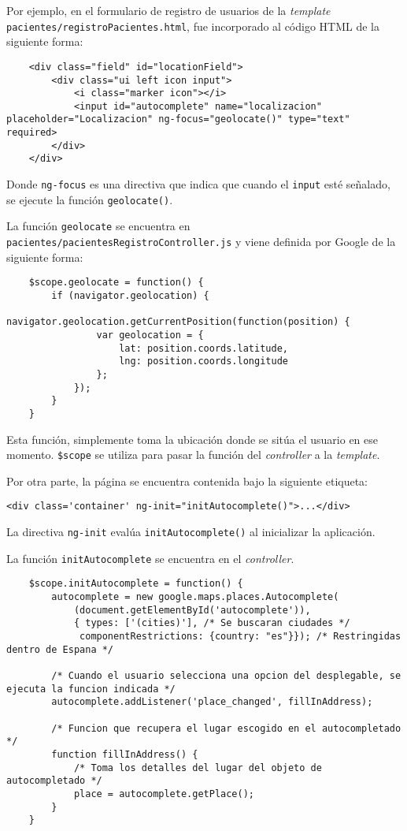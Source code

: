 Por ejemplo, en el formulario de registro de usuarios de la \textit{template} \\ \texttt{pacientes/registroPacientes.html}, fue incorporado al código HTML de la siguiente forma:


\medskip
\begin{lstlisting}
	<div class="field" id="locationField">
		<div class="ui left icon input">
			<i class="marker icon"></i>
			<input id="autocomplete" name="localizacion" placeholder="Localizacion" ng-focus="geolocate()" type="text" required>
		</div>
	</div>
\end{lstlisting}


Donde \texttt{ng-focus} es una directiva que indica que cuando el \texttt{input} esté señalado, se ejecute la función \texttt{geolocate()}.


La función \texttt{geolocate} se encuentra en \\ \texttt{pacientes/pacientesRegistroController.js} y viene definida por Google de la siguiente forma:


\medskip
\begin{lstlisting}
	$scope.geolocate = function() {
		if (navigator.geolocation) {
			navigator.geolocation.getCurrentPosition(function(position) {
				var geolocation = {
					lat: position.coords.latitude,
					lng: position.coords.longitude
				};
			});
		}
	}
\end{lstlisting}


Esta función, simplemente toma la ubicación donde se sitúa el usuario en ese momento. \texttt{\$scope} se utiliza para pasar la función del \textit{controller} a la \textit{template}.


Por otra parte, la página se encuentra contenida bajo la siguiente etiqueta:


\medskip
\begin{lstlisting}
<div class='container' ng-init="initAutocomplete()">...</div>
\end{lstlisting}


La directiva \texttt{ng-init} evalúa \texttt{initAutocomplete()} al inicializar la aplicación.


La función \texttt{initAutocomplete} se encuentra en el \textit{controller}.


\medskip
\begin{lstlisting}
	$scope.initAutocomplete = function() {
		autocomplete = new google.maps.places.Autocomplete(
			(document.getElementById('autocomplete')),
			{ types: ['(cities)'], /* Se buscaran ciudades */
			 componentRestrictions: {country: "es"}}); /* Restringidas dentro de Espana */

		/* Cuando el usuario selecciona una opcion del desplegable, se ejecuta la funcion indicada */
		autocomplete.addListener('place_changed', fillInAddress);

		/* Funcion que recupera el lugar escogido en el autocompletado */
		function fillInAddress() {
			/* Toma los detalles del lugar del objeto de autocompletado */
			place = autocomplete.getPlace();
		}
	}
\end{lstlisting}


